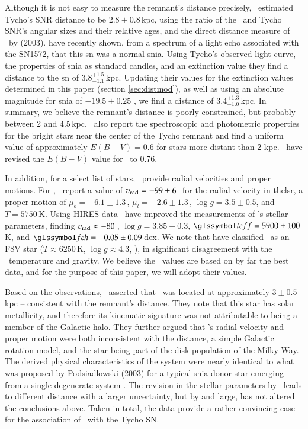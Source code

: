 Although it is not easy to measure the
remnant's distance precisely, \rl\ estimated Tycho's SNR distance to be $2.8 \pm 0.8$\,kpc, using the ratio of the \ and Tycho SNR's angular sizes and their relative ages, and the direct distance measure of \ by \citeauthor*{2003ApJ...585..324W} (2003).  \citet{2008Natur.456..617K} have recently shown, from a spectrum of a light echo associated with the SN1572, that this \gls{sn} was a normal \gls{snia}. Using Tycho's observed light curve, the properties of \gls{snia} as standard candles, and an extinction value they find a distance to the \gls{sn} of $3.8^{+1.5}_{-1.1}$\,kpc. Updating their values for the extinction values determined in this paper (section \ref{sec:distmod}), as well as using an absolute magnitude for \gls{snia} of $-19.5 \pm 0.25$ \citep{2004MNRAS.349.1344A}, we find a distance of $3.4^{+1.3}_{-1.0}$\,kpc. In summary, we believe the remnant's distance is poorly constrained, but probably between 2 and 4.5\,kpc.
\label{sec:obschar}
\rl\ also report the
spectroscopic and photometric properties for the bright stars near the
center of the Tycho remnant and find a uniform value of approximately
$E(B-V)=0.6$ for stars more distant than 2 kpc. \gh\ have revised the $E(B-V)$ value for \starg\ to 0.76.

In addition, for a select list of stars, \rl\ provide radial velocities and proper
motions. 
For \starg, \rl\ report a value of $\hbox{\ensuremath{v_{\textrm{rad}}}}=-99\pm6$\,\kms\ for
the radial velocity in the\gls{lsr}, a
proper motion of $\mu_b=-6.1 \pm 1.3$\,\masyr, $\mu_l=-2.6 \pm
1.3$\,\masyr, $\log{g} = 3.5 \pm 0.5$, and $T=5750$\,K.  Using HIRES data \gh\ have improved the measurements of \starg's stellar parameters, finding  $\hbox{\ensuremath{v_{\textrm{rad}}}} \approx -80$\,\kms, $\log{g} = 3.85 \pm 0.3$, $\teff=5900 \pm 100$\,K, and $\feh=-0.05 \pm 0.09$\,dex. We note that
\citet{2007PASJ...59..811I} have classified \starg\ as an F8V star ($T
\approx 6250 $\,K, $\log{g} \approx 4.3$,
\citealt{1982lbor.book.....A}), in significant disagreement with the
\rl\ temperature and gravity. We believe the \gh\  values are based on by far the best data, and for the purpose of this paper, we will adopt their values. 

Based on the observations, \rl\ asserted that \starg\ was located at
approximately $3\pm 0.5$\,kpc -- consistent with the remnant's
distance.  They note that this star has solar
metallicity, and therefore its kinematic signature was not
attributable to being a member of the Galactic halo. 
They further argued that \starg's radial velocity and proper
motion were both inconsistent with the distance, a simple Galactic
rotation model, and the star being part of the disk population of the Milky Way.
 The derived physical characteristics of the system were nearly identical to
what was proposed by Podsiadlowski (2003) for a typical \gls{snia} donor
star emerging from a single degenerate system \citep[e.g., U Sco; also see ][]{Hachisu:1996p758,Li:1997p437,Hachisu:1999p431,Han:2004p444,Han:2008p726}. The revision in the stellar parameters by
\gh\ leads to different distance with a larger uncertainty, but by and large, has not altered the conclusions above. Taken in total, the data provide a rather convincing case for the association of \starg\ with the Tycho SN.

